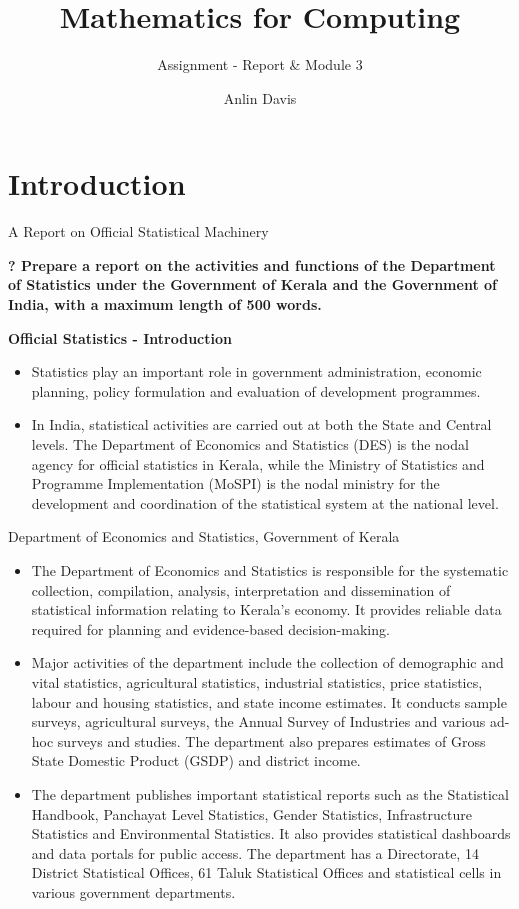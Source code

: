 \documentclass[aspectratio=169]{beamer}
\title{Mathematics for Computing}
\subtitle{Assignment - Report \& Module 3}
\author{Anlin Davis}
\institute{M.Tech AI \& SE}
\date{}   %
\begin{document}
\begin{frame}
\titlepage
\end{frame}


\section{Introduction}
\begin{frame}{A Report on Official Statistical Machinery}
\item \textbf{ ? Prepare a report on the activities and functions of the Department of Statistics under the Government of Kerala and the Government of India, with a maximum length of 500 words.}
\vspace{.8 cm}
\item \textbf{Official Statistics - Introduction}
\vspace{.5 cm}
\begin{itemize}
\item Statistics play an important role in government administration, economic planning, policy formulation and evaluation of development programmes.
\item In India, statistical activities are carried out at both the State and Central levels. The Department of Economics and Statistics (DES) is the nodal agency for official statistics in Kerala, while the Ministry of Statistics and Programme Implementation (MoSPI) is the nodal ministry for the development and coordination of the statistical system at the national level.
\end{itemize}
\end{frame}
\begin{frame}{Department of Economics and Statistics, Government of Kerala}
\begin{itemize}
 \item The Department of Economics and Statistics is responsible for the systematic collection, compilation, analysis, interpretation and dissemination of statistical information relating to Kerala's economy. It provides reliable data required for planning and evidence-based decision-making.

 \item Major activities of the department include the collection of demographic and vital statistics, agricultural statistics, industrial statistics, price statistics, labour and housing statistics, and state income estimates. It conducts sample surveys, agricultural surveys, the Annual Survey of Industries and various ad-hoc surveys and studies. The department also prepares estimates of Gross State Domestic Product (GSDP) and district income.

 \item The department publishes important statistical reports such as the Statistical Handbook, Panchayat Level Statistics, Gender Statistics, Infrastructure Statistics and Environmental Statistics. It also provides statistical dashboards and data portals for public access. The department has a Directorate, 14 District Statistical Offices, 61 Taluk Statistical Offices and statistical cells in various government departments.
\end{itemize}
\end{frame}
\end{document}

